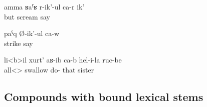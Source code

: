 %
\begin{exe}
	\ex	\label{ex:But she is screaming}
	\gll	amma	ʁaˁʁ	r-ik'-ul	ca-r	ik'\\
		but	scream	say		\\
	\glt	{}

	\ex	\label{ex:(He) is beating}
	\gll	paˁq	Ø-ik'-ul	ca-w\\
		strike	say	\\
	\glt	{}

	\ex	\label{ex:(The wolf) swallowed all her sisters}
	\gll	li<b>il	xurt'	aʁ-ib	ca-b	hel-i-la	ruc-be\\
		all<>	swallow	do- 	that	sister\\
	\glt	{}
\end{exe}



\subsection{Compounds with bound lexical stems}
\label{ssec:compoundswithboundroots}

